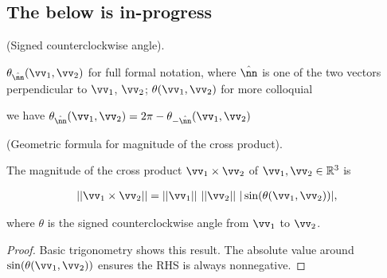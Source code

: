 \subsection*{The below is in-progress}

\begin{defn}
    (Signed counterclockwise angle).
    
    $\theta_{\hat{\nn}}(\vv_1, \vv_2)$ for full formal notation, where $\hat{\nn}$ is one of the two vectors perpendicular to $\vv_1$, $\vv_2$; $\theta(\vv_1, \vv_2)$ for more colloquial
    
    we have $\theta_{\hat{\nn}}(\vv_1, \vv_2) = 2\pi - \theta_{-\hat{\nn}}(\vv_1, \vv_2)$
\end{defn}

\begin{theorem}
    (Geometric formula for magnitude of the cross product).
    
    The magnitude of the cross product $\vv_1 \times \vv_2$ of $\vv_1, \vv_2 \in \R^3$ is
    
    \begin{align*}
        ||\vv_1 \times \vv_2 || = ||\vv_1|| \spc ||\vv_2|| \spc |\sin(\theta(\vv_1, \vv_2))|,
    \end{align*}
    
    where $\theta$ is the signed counterclockwise angle from $\vv_1$ to $\vv_2$.
\end{theorem}

\begin{proof}
   Basic trigonometry shows this result. The absolute value around $\sin(\theta(\vv_1, \vv_2))$ ensures the RHS is always nonnegative.
\end{proof}

